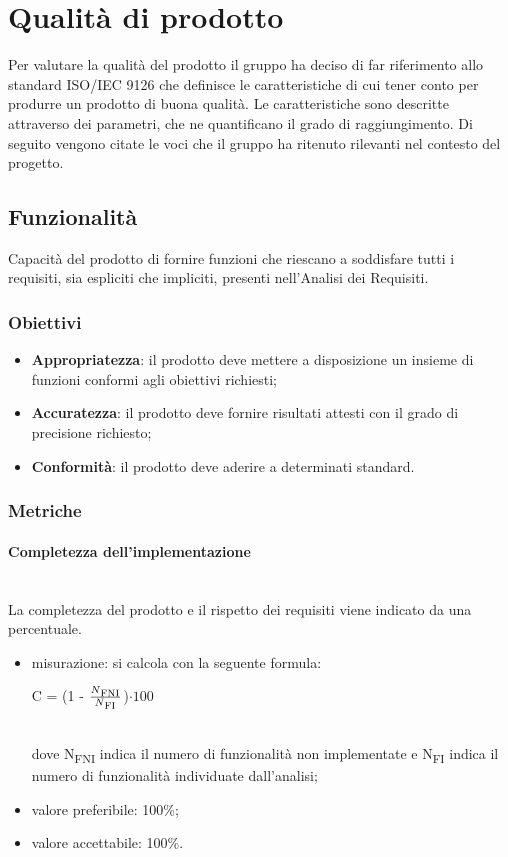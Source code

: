 \section{Qualità di prodotto}
Per valutare la qualità del prodotto il gruppo ha deciso di far riferimento allo standard ISO/IEC 9126\glosp{} che definisce le caratteristiche di cui tener conto per produrre un prodotto di buona qualità. Le caratteristiche sono descritte attraverso dei parametri, che ne quantificano il grado di raggiungimento. Di seguito vengono citate le voci che il gruppo ha ritenuto rilevanti nel contesto del progetto.
	\subsection{Funzionalità}
	Capacità del prodotto di fornire funzioni che riescano a soddisfare tutti i requisiti, sia espliciti che impliciti, presenti nell'Analisi dei Requisiti.
		\subsubsection{Obiettivi}
		\begin{itemize}
			\item \textbf{Appropriatezza}: il prodotto deve mettere a disposizione un insieme di funzioni conformi agli obiettivi richiesti;
			\item \textbf{Accuratezza}: il prodotto deve fornire risultati attesti con il grado di precisione richiesto;
			\item \textbf{Conformità}: il prodotto deve aderire a determinati standard. %
		\end{itemize}
		\subsubsection{Metriche}
			\paragraph{Completezza dell'implementazione}\mbox{}\\
			La completezza del prodotto e il rispetto dei requisiti viene indicato da una percentuale.
			\begin{itemize}
			\item misurazione: si calcola con la seguente formula: \\
			\centerline { C = (1 - \(\frac{N\textsubscript{FNI}}{N\textsubscript{FI}} \))$ \cdot  100$ } \\
			dove N\textsubscript{FNI} indica il numero di funzionalità non implementate e N\textsubscript{FI} indica il numero di funzionalità individuate dall'analisi;
			\item valore preferibile: 100\%;
			\item valore accettabile: 100\%.
			\end{itemize}
